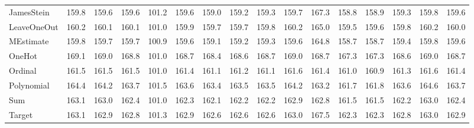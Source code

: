 \begin{tabular}{lrrrrrrrrrrrrrrr}
JamesStein         &     159.8 &             159.6 &   159.6 &    101.2 &   159.6 &    159.0 &   159.2 &   159.3 &    159.7 &    167.3 &      158.8 &      158.9 &      159.3 &           159.8 &   159.6 \\
LeaveOneOut        &     160.2 &             160.1 &   160.1 &    101.0 &   159.9 &    159.7 &   159.7 &   159.8 &    160.2 &    165.0 &      159.5 &      159.6 &      159.8 &           160.2 &   160.0 \\
MEstimate          &     159.8 &             159.7 &   159.7 &    100.9 &   159.6 &    159.1 &   159.2 &   159.3 &    159.6 &    164.8 &      158.7 &      158.7 &      159.4 &           159.8 &   159.6 \\
OneHot             &     169.1 &             169.0 &   168.8 &    101.0 &   168.7 &    168.4 &   168.6 &   168.7 &    169.0 &    168.7 &      167.3 &      167.3 &      168.6 &           169.0 &   168.7 \\
Ordinal            &     161.5 &             161.5 &   161.5 &    101.0 &   161.4 &    161.1 &   161.2 &   161.1 &    161.6 &    161.4 &      161.0 &      160.9 &      161.3 &           161.6 &   161.4 \\
Polynomial         &     164.4 &             164.2 &   163.7 &    101.5 &   163.6 &    163.4 &   163.5 &   163.5 &    164.2 &    163.2 &      161.7 &      161.8 &      163.6 &           164.6 &   163.7 \\
Sum                &     163.1 &             163.0 &   162.4 &    101.0 &   162.3 &    162.1 &   162.2 &   162.2 &    162.9 &    162.8 &      161.5 &      161.5 &      162.2 &           163.0 &   162.4 \\
Target             &     163.1 &             162.9 &   162.8 &    101.3 &   162.9 &    162.6 &   162.6 &   162.6 &    163.0 &    167.5 &      162.3 &      162.3 &      162.8 &           163.0 &   162.9 \\
\bottomrule
\end{tabular}
